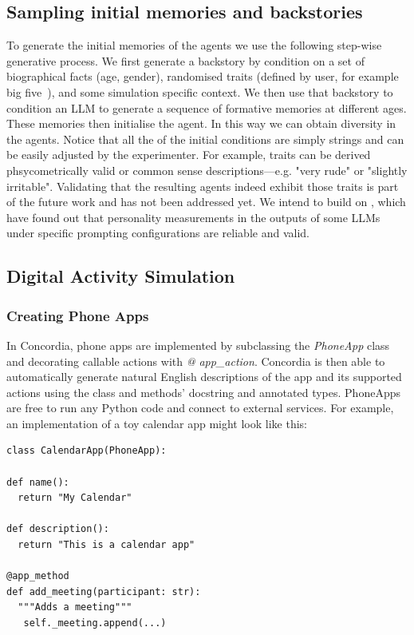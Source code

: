 \documentclass[11pt, a4paper, logo, twocolumn, internal, copyright, numbering]{googledeepmind}
\begin{document}
\subsection{Sampling initial memories and backstories}
To generate the initial memories of the agents we use the following step-wise generative process. We first generate a backstory by condition on a set of biographical facts (age, gender), randomised traits (defined by user, for example big five~\cite{Nettle2007Personality}), and some simulation specific context. We then use that backstory to condition an LLM to generate a sequence of formative memories at different ages. These memories then initialise the agent. In this way we can obtain diversity in the agents. Notice that all the of the initial conditions are simply strings and can be easily adjusted by the experimenter. For example, traits can be derived phsycometrically valid or common sense descriptions---e.g. "very rude" or "slightly irritable". Validating that the resulting agents indeed exhibit those traits is part of the future work and has not been addressed yet. We intend to build on \cite{safdari2023personality}, which have found out that personality measurements in the outputs of some LLMs under specific prompting configurations are reliable and valid.

\subsection{Digital Activity Simulation}
\subsubsection{Creating Phone Apps}
In Concordia, phone apps are implemented by subclassing the \textit{PhoneApp} class and decorating callable actions with \textit{@ app\_action}. Concordia is then able to automatically generate natural English descriptions of the app and its supported actions using the class and methods' docstring and annotated types. PhoneApps are free to run any Python code and connect to external services. For example, an implementation of a toy calendar app might look like this:
\begin{lstlisting}
class CalendarApp(PhoneApp):

def name():
  return "My Calendar"

def description():
  return "This is a calendar app"

@app_method
def add_meeting(participant: str):
  """Adds a meeting"""
   self._meeting.append(...)
\end{lstlisting}
\end{document}
